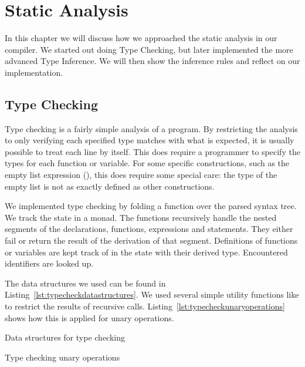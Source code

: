 \chapter{Static Analysis}

In this chapter we will discuss how we approached the static analysis in our compiler.
We started out doing Type Checking, but later implemented the more advanced Type Inference.
We will then show the inference rules and reflect on our implementation.

\section{Type Checking}

Type checking is a fairly simple analysis of a program.
By restricting the analysis to only verifying each specified type matches with what is expected, it is usually possible to treat each line by itself.
This does require a programmer to specify the types for each function or variable.
For some specific constructions, such as the empty list expression (\spl{[]}), this does require some special care: the type of the empty list is not as exactly defined as other constructions.

We implemented type checking by folding a function over the parsed syntax tree.
We track the state in a monad.
The functions recursively handle the nested segments of the declarations, functions, expressions and statements.
They either fail or return the result of the derivation of that segment.
Definitions of functions or variables are kept track of in the state with their derived type.
Encountered identifiers are looked up.

The data structures we used can be found in Listing~\ref{lst:typecheckdatastructures}.
We used several simple utility functions like  to restrict the results of recursive  calls.
Listing~\ref{lst:typecheckunaryoperations} shows how this is applied for unary operations.

\begin{listing}[hbtp]
    \centering
    \caption{Data structures for type checking}\label{lst:typecheckdatastructures}
\end{listing}

\begin{listing}[hbtp]
    \centering
    \caption{Type checking unary operations}\label{lst:typecheckunaryoperations}
\end{listing}

